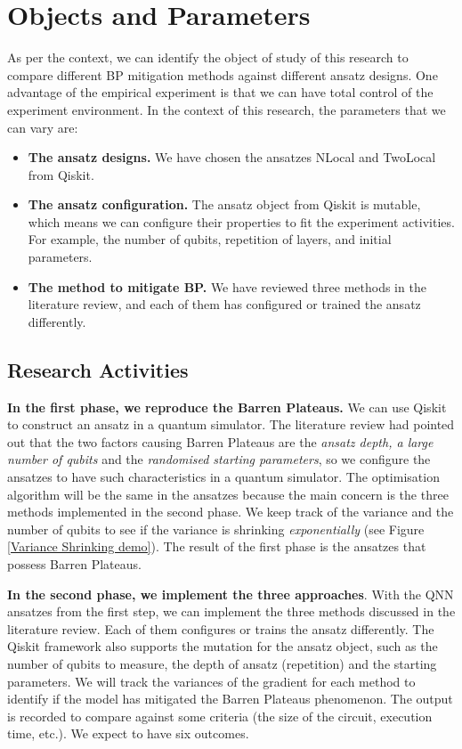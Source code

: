 \section{Objects and Parameters}

As per the context, we can identify the object of study of this research to compare different BP mitigation methods against different ansatz designs.
One advantage of the empirical experiment is that we can have total control of the experiment environment. 
In the context of this research, the parameters that we can vary are:
\begin{itemize}
    \item \textbf{The ansatz designs.} We have chosen the ansatzes NLocal and TwoLocal from Qiskit.
    \item \textbf{The ansatz configuration.} The ansatz object from Qiskit is mutable, which means we can configure their properties to fit the experiment activities. For example, the number of qubits, repetition of layers, and initial parameters.
    \item \textbf{The method to mitigate BP.} We have reviewed three methods in the literature review, and each of them has configured or trained the ansatz differently.
\end{itemize}

\subsection{Research Activities}
\textbf{In the first phase, we reproduce the Barren Plateaus.} 
We can use Qiskit \cite{Qiskit} to construct an ansatz in a quantum simulator.
The literature review had pointed out that the two factors causing Barren Plateaus are the \textit{ansatz depth, a large number of qubits} and the \textit{randomised starting parameters}, so we configure the ansatzes to have such characteristics in a quantum simulator.
The optimisation algorithm will be the same in the ansatzes because the main concern is the three methods implemented in the second phase.
We keep track of the variance and the number of qubits to see if the variance is shrinking  \textit{exponentially} (see Figure \ref{Variance Shrinking demo}).
The result of the first phase is the ansatzes that possess Barren Plateaus.

\textbf{In the second phase, we implement the three approaches}.
With the QNN ansatzes from the first step, we can implement the three methods discussed in the literature review.
Each of them configures or trains the ansatz differently.
The Qiskit framework also supports the mutation for the ansatz object, such as the number of qubits to measure, the depth of ansatz (repetition) and the starting parameters.
We will track the variances of the gradient for each method to identify if the model has mitigated the Barren Plateaus phenomenon.
The output is recorded to compare against some criteria (the size of the circuit, execution time, etc.). We expect to have six outcomes.

